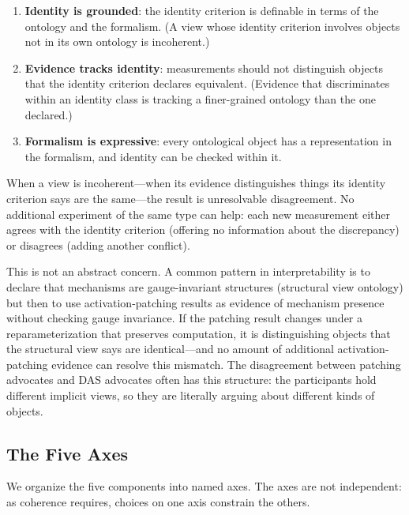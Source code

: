 \documentclass{article}
\begin{document}
\begin{enumerate}[leftmargin=*, label=(\roman*)]
\item \textbf{Identity is grounded}: the identity criterion is
      definable in terms of the ontology and the formalism.  (A view
      whose identity criterion involves objects not in its own ontology
      is incoherent.)
\item \textbf{Evidence tracks identity}: measurements should not
      distinguish objects that the identity criterion declares
      equivalent.  (Evidence that discriminates within an identity
      class is tracking a finer-grained ontology than the one
      declared.)
\item \textbf{Formalism is expressive}: every ontological object has
      a representation in the formalism, and identity can be checked
      within it.
\end{enumerate}

When a view is incoherent---when its evidence distinguishes things its
identity criterion says are the same---the result is unresolvable
disagreement.  No additional experiment of the same type can help:
each new measurement either agrees with the identity criterion (offering
no information about the discrepancy) or disagrees (adding another
conflict).

This is not an abstract concern.  A common pattern in interpretability
is to declare that mechanisms are gauge-invariant structures (structural
view ontology) but then to use activation-patching results as evidence
of mechanism presence without checking gauge invariance.  If the
patching result changes under a reparameterization that preserves
computation, it is distinguishing objects that the structural view says
are identical---and no amount of additional activation-patching evidence
can resolve this mismatch.  The disagreement between patching advocates
and DAS advocates often has this structure: the participants hold
different implicit views, so they are literally arguing about different
kinds of objects.

\subsection{The Five Axes}\label{sec:axes}

We organize the five components into named axes.  The axes are not
independent: as coherence requires, choices on one axis constrain the
others.
\end{document}
